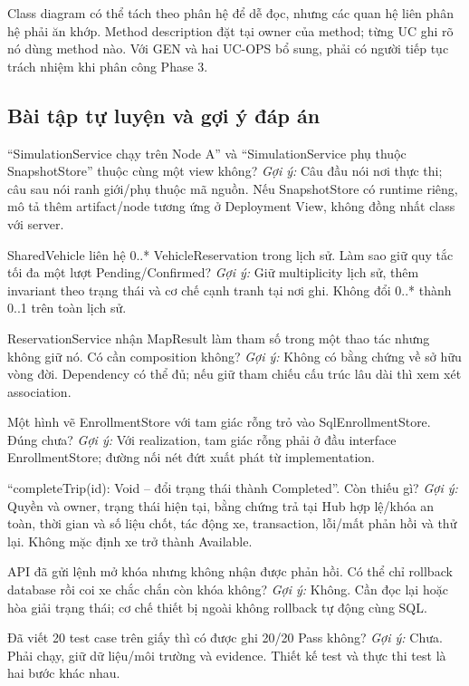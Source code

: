Class diagram có thể tách theo phân hệ để dễ đọc, nhưng các quan hệ liên phân hệ phải ăn khớp. Method description đặt tại owner của method; từng UC ghi rõ nó dùng method nào. Với GEN và hai UC-OPS bổ sung, phải có người tiếp tục trách nhiệm khi phân công Phase 3.

\subsection{Bài tập tự luyện và gợi ý đáp án}
``SimulationService chạy trên Node A'' và ``SimulationService phụ thuộc SnapshotStore'' thuộc cùng một view không?
\textit{Gợi ý:} Câu đầu nói nơi thực thi; câu sau nói ranh giới/phụ thuộc mã nguồn. Nếu SnapshotStore có runtime riêng, mô tả thêm artifact/node tương ứng ở Deployment View, không đồng nhất class với server.

SharedVehicle liên hệ 0..* VehicleReservation trong lịch sử. Làm sao giữ quy tắc tối đa một lượt Pending/Confirmed?
\textit{Gợi ý:} Giữ multiplicity lịch sử, thêm invariant theo trạng thái và cơ chế cạnh tranh tại nơi ghi. Không đổi 0..* thành 0..1 trên toàn lịch sử.

ReservationService nhận MapResult làm tham số trong một thao tác nhưng không giữ nó. Có cần composition không?
\textit{Gợi ý:} Không có bằng chứng về sở hữu vòng đời. Dependency có thể đủ; nếu giữ tham chiếu cấu trúc lâu dài thì xem xét association.

Một hình vẽ EnrollmentStore với tam giác rỗng trỏ vào SqlEnrollmentStore. Đúng chưa?
\textit{Gợi ý:} Với realization, tam giác rỗng phải ở đầu interface EnrollmentStore; đường nối nét đứt xuất phát từ implementation.

``completeTrip(id): Void -- đổi trạng thái thành Completed''. Còn thiếu gì?
\textit{Gợi ý:} Quyền và owner, trạng thái hiện tại, bằng chứng trả tại Hub hợp lệ/khóa an toàn, thời gian và số liệu chốt, tác động xe, transaction, lỗi/mất phản hồi và thử lại. Không mặc định xe trở thành Available.

API đã gửi lệnh mở khóa nhưng không nhận được phản hồi. Có thể chỉ rollback database rồi coi xe chắc chắn còn khóa không?
\textit{Gợi ý:} Không. Cần đọc lại hoặc hòa giải trạng thái; cơ chế thiết bị ngoài không rollback tự động cùng SQL.

Đã viết 20 test case trên giấy thì có được ghi 20/20 Pass không?
\textit{Gợi ý:} Chưa. Phải chạy, giữ dữ liệu/môi trường và evidence. Thiết kế test và thực thi test là hai bước khác nhau.

